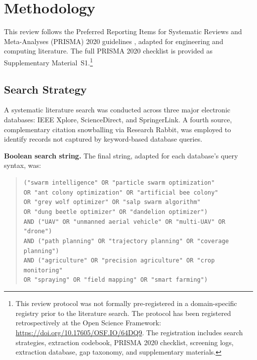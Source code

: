 \documentclass[review,3p]{elsarticle}
\begin{document}
\section{Methodology}

This review follows the Preferred Reporting Items for Systematic Reviews and
Meta-Analyses (PRISMA) 2020 guidelines \cite{page2021}, adapted for engineering
and computing literature. The full PRISMA 2020 checklist is provided as
Supplementary Material~S1.\footnote{This review protocol was not formally
pre-registered in a domain-specific registry prior to the literature search.
The protocol has been registered retrospectively at the Open Science Framework:
\url{https://doi.org/10.17605/OSF.IO/64DQ9}. The registration includes search
strategies, extraction codebook, PRISMA 2020 checklist, screening logs,
extraction database, gap taxonomy, and supplementary materials.}

\subsection{Search Strategy}

A systematic literature search was conducted across three major electronic
databases: IEEE Xplore, ScienceDirect, and SpringerLink. A fourth source,
complementary citation snowballing via Research Rabbit, was employed to identify
records not captured by keyword-based database queries.

\textbf{Boolean search string.} The final string, adapted for each database's
query syntax, was:

\begin{quote}
\small
\texttt{("swarm intelligence" OR "particle swarm optimization"} \\
\texttt{OR "ant colony optimization" OR "artificial bee colony"} \\
\texttt{OR "grey wolf optimizer" OR "salp swarm algorithm"} \\
\texttt{OR "dung beetle optimizer" OR "dandelion optimizer")} \\
\texttt{AND ("UAV" OR "unmanned aerial vehicle" OR "multi-UAV" OR "drone")} \\
\texttt{AND ("path planning" OR "trajectory planning" OR "coverage planning")} \\
\texttt{AND ("agriculture" OR "precision agriculture" OR "crop monitoring"} \\
\texttt{OR "spraying" OR "field mapping" OR "smart farming")}
\end{quote}
\end{document}
